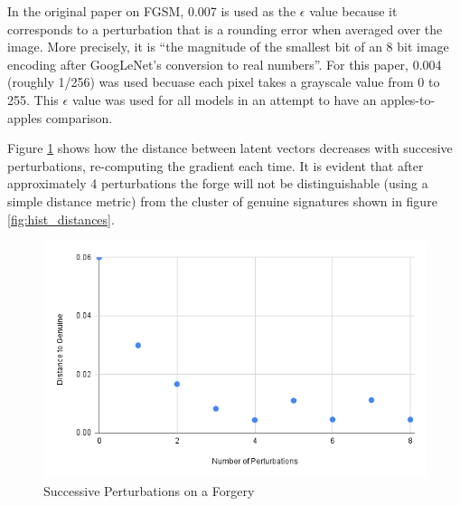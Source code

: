 In the original paper on FGSM, 0.007 is used as the $\epsilon$ value because it corresponds to a perturbation that is a rounding error when averaged over the image.
More precisely, it is ``the magnitude of the smallest bit of an 8 bit image encoding after GoogLeNet's conversion to real numbers''\cite{goodfellow}.
For this paper, 0.004 (roughly 1/256) was used becuase each pixel takes a grayscale value from 0 to 255.
This $\epsilon$ value was used for all models in an attempt to have an apples-to-apples comparison.

Figure \ref{fig:dist_vs_perts} shows how the distance between latent vectors decreases with succesive perturbations, re-computing the gradient each time.
It is evident that after approximately 4 perturbations the forge will not be distinguishable (using a simple distance metric) from the cluster of genuine signatures shown in figure \ref{fig:hist_distances}.
\begin{figure}[h]
    \begin{center}
        \includegraphics[width=0.8\linewidth]{dist_pert_plot.png}
    \end{center}
    \caption{Successive Perturbations on a Forgery}
    \label{fig:dist_vs_perts}
\end{figure}

